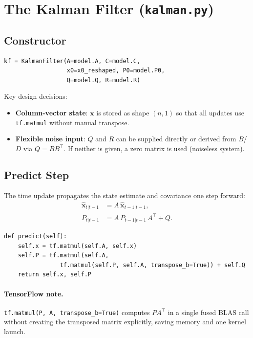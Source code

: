 \documentclass[11pt,a4paper]{article}
\newcommand{\py}[1]{\lstinline[style=py]{#1}}
\newcommand{\file}[1]{\texttt{#1}}
\begin{document}
\section{The Kalman Filter (\file{kalman.py})}
\label{sec:kf}

\subsection{Constructor}

\begin{lstlisting}[caption={KalmanFilter initialisation.}]
kf = KalmanFilter(A=model.A, C=model.C,
                  x0=x0_reshaped, P0=model.P0,
                  Q=model.Q, R=model.R)
\end{lstlisting}

Key design decisions:
\begin{itemize}
\item \textbf{Column-vector state}: $\bm{x}$ is stored as shape
  $(n, 1)$ so that all updates use \py{tf.matmul} without manual
  transpose.
\item \textbf{Flexible noise input}: $Q$ and $R$ can be supplied
  directly or derived from $B$/$D$ via $Q = BB^\top$.
  If neither is given, a zero matrix is used (noiseless system).
\end{itemize}

\subsection{Predict Step}
\label{sec:predict}

The time update propagates the state estimate and covariance one step
forward:
\begin{align}
  \hat{\bm{x}}_{t|t-1} &= A\,\hat{\bm{x}}_{t-1|t-1},
    \label{eq:kf-pred-mean}\\
  P_{t|t-1} &= A\,P_{t-1|t-1}\,A^\top + Q.
    \label{eq:kf-pred-cov}
\end{align}

\begin{lstlisting}[caption={Predict step implementation.}]
def predict(self):
    self.x = tf.matmul(self.A, self.x)
    self.P = tf.matmul(self.A,
                tf.matmul(self.P, self.A, transpose_b=True)) + self.Q
    return self.x, self.P
\end{lstlisting}

\paragraph{TensorFlow note.}
\py{tf.matmul(P, A, transpose_b=True)} computes $PA^\top$ in a
single fused BLAS call without creating the transposed matrix
explicitly, saving memory and one kernel launch.
\end{document}

